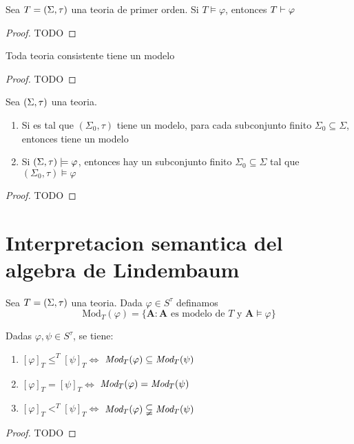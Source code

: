 \begin{theorem}
  Sea $T=(\Sigma,\tau)$ una teoria de primer orden. Si $T\models\varphi$, entonces $T\vdash\varphi$
\end{theorem}
\begin{proof}
  TODO
\end{proof}
\begin{corollary}
  Toda teoria consistente tiene un modelo
\end{corollary}
\begin{proof}
  TODO
\end{proof}
\begin{corollary}
  Sea $(\Sigma,\tau)$ una teoria. \begin{enumerate}
    \item Si \forder es tal que $(\Sigma_0,\tau)$ tiene un modelo, para cada subconjunto finito $\Sigma_0\subseteq\Sigma$, entonces \forder tiene un modelo
    \item Si $(\Sigma,\tau)\models\varphi$, entonces hay un subconjunto finito $\Sigma_0\subseteq\Sigma$ tal que $(\Sigma_0,\tau)\models\varphi$
  \end{enumerate}
\end{corollary}
\begin{proof}
  TODO
\end{proof}

\section{Interpretacion semantica del algebra de Lindembaum}
\begin{definition}
  Sea $T=(\Sigma,\tau)$ una teoria. Dada $\varphi\in S^\tau$ definamos
  $$
  \text{Mod}_T(\varphi)=\{\mathbf{A}:\mathbf{A} \text{ es modelo de } T \text{ y } \mathbf{A}\models\varphi\}
  $$
\end{definition}

\begin{lemma}
  Dadas $\varphi,\psi \in S^\tau$, se tiene:\begin{enumerate}
    \item $[\varphi]_T\leq^T[\psi]_T\iff$ $\emph{Mod}_T(\varphi)\subseteq\emph{Mod}_T(\psi)$
    \item $[\varphi]_T=[\psi]_T\iff$ $\emph{Mod}_T(\varphi)=\emph{Mod}_T(\psi)$
    \item $[\varphi]_T<^T[\psi]_T\iff$ $\emph{Mod}_T(\varphi)\subsetneqq\emph{Mod}_T(\psi)$
  \end{enumerate}
\end{lemma}
\begin{proof}
  TODO
\end{proof}
